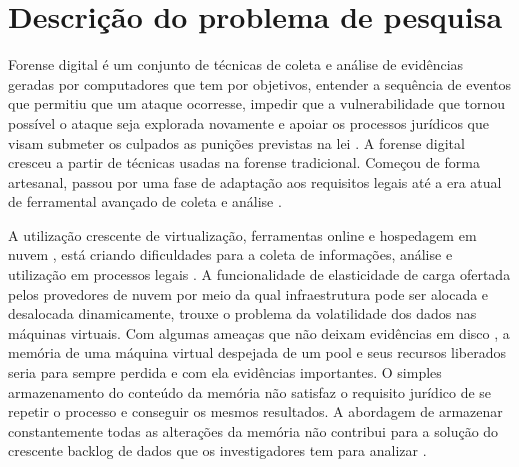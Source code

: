 \documentclass[12pt,				%
	openright,			%
	oneside,			%
	a4paper,			%
	english,			%
	brazil				%
	]{abntex2}
\begin{document}




\textual

\chapter{Descrição do problema de pesquisa} \label{chap:intro}
%
Forense digital é um conjunto de técnicas de coleta e análise de evidências geradas por computadores que tem por objetivos, entender a sequência de eventos que permitiu que um 
ataque ocorresse, impedir que a vulnerabilidade que tornou possível o ataque seja explorada novamente e apoiar os processos jurídicos que visam submeter os culpados as punições
previstas na lei \cite{Sang2013}. 
A forense digital cresceu a partir de técnicas usadas na forense tradicional. Começou de forma artesanal, passou por uma fase de adaptação aos requisitos legais até a era atual
de ferramental avançado de coleta e análise \cite{Charters2008}.

A utilização crescente de virtualização, ferramentas online e hospedagem em nuvem \cite{Amazon2016}, está criando dificuldades para a coleta de informações, análise e utilização 
em processos legais \cite{Sharma2012}. A funcionalidade de elasticidade de carga ofertada pelos provedores de nuvem por meio da qual infraestrutura pode ser 
alocada e desalocada dinamicamente, trouxe o problema da volatilidade dos dados nas máquinas virtuais. Com algumas ameaças que não deixam evidências em disco \cite{Rafique2013}, 
a memória de uma máquina virtual despejada de um pool e seus recursos liberados seria para sempre perdida e com ela evidências importantes. O simples armazenamento do conteúdo 
da memória não satisfaz o requisito jurídico de se repetir o processo e conseguir os mesmos resultados. A abordagem de armazenar constantemente todas as alterações da
memória não contribui para a solução do crescente backlog de dados que os investigadores tem para analizar \cite{Quick2014}. 
\end{document}

